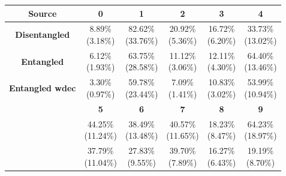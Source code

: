 \documentclass{report}
\begin{document}
\begin{center}
{\tiny
  \begin{tabular}{c|c|c|c|c|c|}
  \hline
  \multicolumn{1}{|c|}{\textbf{Source}} & \textbf{0} & \textbf{1} & \textbf{2} & \textbf{3} & \textbf{4}\\ \hline
  \multicolumn{1}{|c|}{\textbf{Disentangled}} & \cellcolor{light-gray} \makecell{8.89\% \\ (3.18\%)} & \cellcolor{light-gray} \makecell{82.62\% \\ (33.76\%)} & \cellcolor{light-gray} \makecell{20.92\% \\ (5.36\%)} & \cellcolor{light-gray} \makecell{16.72\% \\ (6.20\%)} & \makecell{33.73\% \\ (13.02\%)} \\ \hline
  \multicolumn{1}{|c|}{\textbf{Entangled}} & \makecell{6.12\% \\ (1.93\%)} & \makecell{63.75\% \\ (28.58\%)} & \makecell{11.12\% \\ (3.06\%)} & \makecell{12.11\% \\ (4.30\%)} & \cellcolor{light-gray} \makecell{64.40\% \\ (13.46\%)} \\ \hline
  \multicolumn{1}{|c|}{\textbf{Entangled wdec}} & \makecell{3.30\% \\ (0.97\%)} & \makecell{59.78\% \\ (23.44\%)} & \makecell{7.09\% \\ (1.41\%)} & \makecell{10.83\% \\ (3.02\%)} & \makecell{53.99\% \\ (10.94\%)} \\ \hline
  & \textbf{5} & \textbf{6} & \textbf{7} & \textbf{8} & \textbf{9} \\ \cline{2-6}
  & \cellcolor{light-gray} \makecell{44.25\% \\ (11.24\%)} & \cellcolor{light-gray} \makecell{38.49\% \\ (13.48\%)} & \cellcolor{light-gray} \makecell{40.57\% \\ (11.65\%)} & \makecell{18.23\% \\ (8.47\%)} & \cellcolor{light-gray} \makecell{64.23\% \\ (18.97\%)} \\ \cline{2-6}
  & \makecell{37.79\% \\ (11.04\%)} & \makecell{27.83\% \\ (9.55\%)} & \makecell{39.70\% \\ (7.89\%)} & \makecell{16.27\% \\ (6.43\%)} & \makecell{19.19\% \\ (8.70\%)} \\ \cline{2-6}

\end{tabular}}
\end{center}
\end{document}
